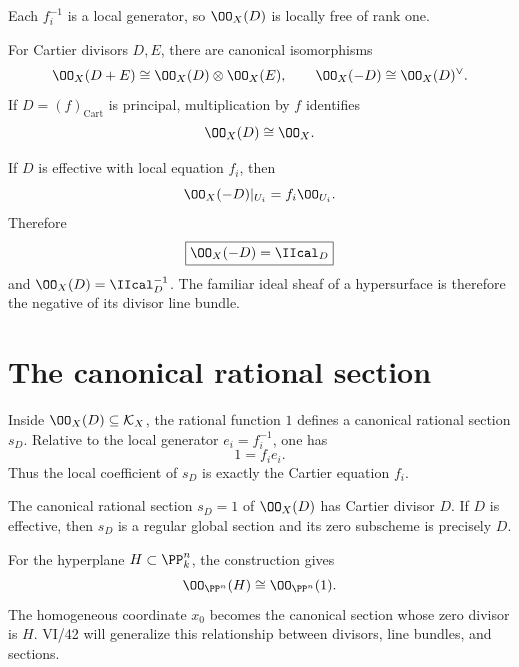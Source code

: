 Each \(f_i^{-1}\) is a local generator, so \(\OO_X(D)\) is locally free of rank one.

\begin{proposition}\label{prop:vi40-oxd-identities}
For Cartier divisors \(D,E\), there are canonical isomorphisms
\[
 \OO_X(D+E)\cong\OO_X(D)\otimes\OO_X(E),
 \qquad
 \OO_X(-D)\cong\OO_X(D)^\vee.
\]
If \(D=(f)_{\mathrm{Cart}}\) is principal, multiplication by \(f\) identifies
\[
 \OO_X(D)\cong\OO_X.
\]
\end{proposition}

\begin{example}\label{ex:vi40-effective-ideal-linebundle}
If \(D\) is effective with local equation \(f_i\), then
\[
 \OO_X(-D)|_{U_i}=f_i\OO_{U_i}.
\]
Therefore
\[
 \boxed{\OO_X(-D)=\IIcal_D}
\]
and \(\OO_X(D)=\IIcal_D^{-1}\).  The familiar ideal sheaf of a hypersurface is therefore the negative of its divisor line bundle.
\end{example}



\section{The canonical rational section}
Inside \(\OO_X(D)\subseteq\KX\), the rational function \(1\) defines a canonical rational section \(s_D\).  Relative to the local generator \(e_i=f_i^{-1}\), one has
\[
 1=f_i e_i.
\]
Thus the local coefficient of \(s_D\) is exactly the Cartier equation \(f_i\).

\begin{proposition}\label{prop:vi40-canonical-section}
The canonical rational section \(s_D=1\) of \(\OO_X(D)\) has Cartier divisor \(D\).  If \(D\) is effective, then \(s_D\) is a regular global section and its zero subscheme is precisely \(D\).
\end{proposition}

\begin{example}\label{ex:vi40-hyperplane-bundle}
For the hyperplane \(H\subset\PP^n_k\), the construction gives
\[
 \OO_{\PP^n}(H)\cong\OO_{\PP^n}(1).
\]
The homogeneous coordinate \(x_0\) becomes the canonical section whose zero divisor is \(H\).  VI/42 will generalize this relationship between divisors, line bundles, and sections.
\end{example}

